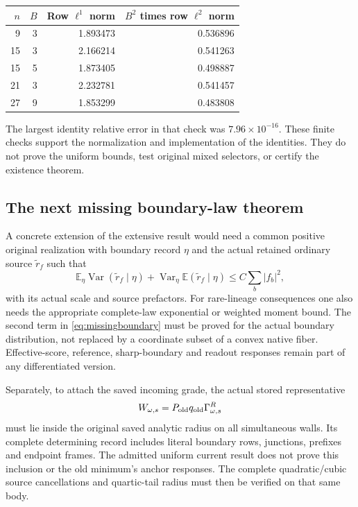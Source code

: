 \documentclass[11pt,letterpaper]{article}
\numberwithin{equation}{section}
\theoremstyle{definition}\newtheorem{definition}[theorem]{Definition}
\theoremstyle{remark}\newtheorem{remark}[theorem]{Remark}
\newcommand{\E}{\mathbb E}\newcommand{\Var}{\operatorname{Var}}
\begin{document}
\begin{center}
\begin{tabular}{rrrr}
\toprule
$n$ & $B$ & Row $\ell^1$ norm & $B^2$ times row $\ell^2$ norm\\
\midrule
9 & 3 & 1.893473 & 0.536896\\
15 & 3 & 2.166214 & 0.541263\\
15 & 5 & 1.873405 & 0.498887\\
21 & 3 & 2.232781 & 0.541457\\
27 & 9 & 1.853299 & 0.483808\\
\bottomrule
\end{tabular}
\end{center}
The largest identity relative error in that check was $7.96\times10^{-16}$. These finite checks support the normalization and implementation of the identities. They do not prove the uniform bounds, test original mixed selectors, or certify the existence theorem.

\subsection{The next missing boundary-law theorem}

A concrete extension of the extensive result would need a common positive original realization with boundary record $\eta$ and the actual retained ordinary source $\widetilde r_f$ such that
\begin{equation}
 \E_\eta\Var(\widetilde r_f\mid\eta)
 +\Var_\eta\E(\widetilde r_f\mid\eta)
 \le C\sum_b|f_b|^2,
 \label{eq:missingboundary}
\end{equation}
with its actual scale and source prefactors. For rare-lineage consequences one also needs the appropriate complete-law exponential or weighted moment bound. The second term in \eqref{eq:missingboundary} must be proved for the actual boundary distribution, not replaced by a coordinate subset of a convex native fiber. Effective-score, reference, sharp-boundary and readout responses remain part of any differentiated version.

Separately, to attach the saved incoming grade, the actual stored representative
\[
 W_{\omega,s}=P_{\rm old}q_{\rm old}\Gamma^R_{\omega,s}
\]
must lie inside the original saved analytic radius on all simultaneous walls. Its complete determining record includes literal boundary rows, junctions, prefixes and endpoint frames. The admitted uniform current result does not prove this inclusion or the old minimum's anchor responses. The complete quadratic/cubic source cancellations and quartic-tail radius must then be verified on that same body.
\end{document}
